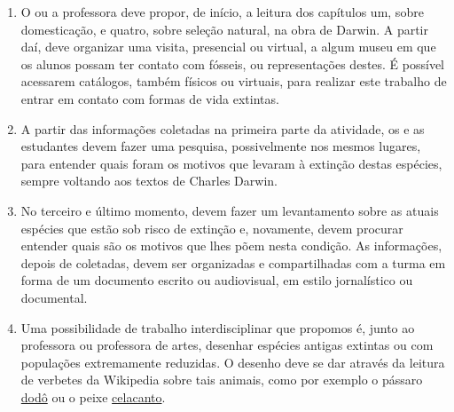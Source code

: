\documentclass[11pt]{extarticle}
\begin{document}
\begin{enumerate}
	\item
	O ou a professora deve propor, de início, a leitura dos capítulos um, sobre domesticação,
	e quatro, sobre seleção natural, na obra de Darwin. 
	A partir daí, deve organizar uma visita, presencial ou virtual, a algum museu em que os alunos possam
	ter contato com fósseis, ou representações destes. É possível acessarem catálogos, também
	físicos ou virtuais, para realizar este trabalho de entrar em contato com formas de vida
	extintas. 


	\item
	A partir das informações coletadas na primeira parte da atividade, os e as estudantes
	devem fazer uma pesquisa, possivelmente nos mesmos lugares, para entender
	quais foram os motivos que levaram à extinção destas espécies, sempre voltando
	aos textos de Charles Darwin.

	\item
	No terceiro e último momento, devem fazer um levantamento sobre as atuais
	espécies que estão sob risco de extinção e, novamente, devem procurar
	entender quais são os motivos que lhes põem nesta condição. As informações,
	depois de coletadas, devem ser organizadas e compartilhadas com a turma em forma 
	de um documento escrito ou audiovisual, em estilo jornalístico ou documental. 

	\item
	Uma possibilidade de trabalho interdisciplinar que propomos é, junto ao
	professora ou professora de artes, desenhar espécies antigas extintas ou com populações extremamente reduzidas. O desenho deve se dar através da 
	leitura de verbetes da Wikipedia sobre tais animais, como por exemplo o pássaro 
	\href{https://pt.wikipedia.org/wiki/Dod\%C3\%B4\#:~:text=Dod\%C3\%B4\%20ou\%20dod\%C3\%B3\%20(nome\%20cient\%C3\%ADfico,naturais\%20na\%20ilha\%20que\%20habitava}{dodô} ou o peixe 
	\href{https://pt.wikipedia.org/wiki/Celacanto\#:~:text=do\%20mar\%20profundo.-,Descri\%C3\%A7\%C3\%A3o\%20f\%C3\%ADsica,os\%20peixes\%20de\%20nadadeiras\%20lobadas.\&text=Possuem\%20uma\%20nadadeira\%20caudal\%20de,para\%20al\%C3\%A9m\%20da\%20cauda\%20prim\%C3\%A1ria}{celacanto}.

\end{enumerate}
\end{document}
